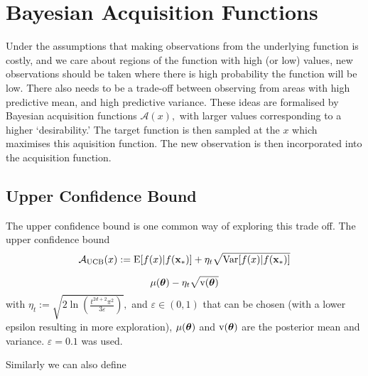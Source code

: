 \begin{figure}[htbp]
\end{figure}

\section{Bayesian Acquisition Functions}

Under the assumptions that making observations from the underlying function is
costly, and we care about regions of the function with high (or low)
values, new observations should be taken where there is high probability the
function will be low. There also needs to be a trade-off between observing from
areas with high predictive mean, and high predictive variance. These ideas are
formalised by Bayesian acquisition functions $\mathcal{A}(x),$ with larger 
values corresponding to a higher `desirability.' The target function is then 
sampled at the $x$ which maximises this aquisition function. The new 
observation is then incorporated into the acquisition function.

\subsection*{Upper Confidence Bound}

The upper confidence bound is one common way of exploring this trade off. The 
upper confidence bound
$$
    \mathcal{A}_\text{UCB}(x)
    := \operatorname{E}[f(x) | f(\mathbf{x}_*)]
    + \eta_t \sqrt{\mathrm{Var}[f(x) | f(\mathbf{x}_*)]}
$$


$$\mu(\bm{\theta}) - \eta_t\sqrt{\mathrm{v}(\bm{\theta})}$$
with $\eta_t:= \sqrt{2\ln(\frac{t^{2d + 2}\pi^2}{3\varepsilon})},$ and
$\varepsilon \in (0, 1)$ that can be chosen
(with a lower epsilon resulting in more exploration), $\mu(\bm{\theta})$ and
$\mathrm{v}(\bm{\theta})$ are the posterior mean and variance.
$\varepsilon = 0.1$ was used.


Similarly we can also define 

